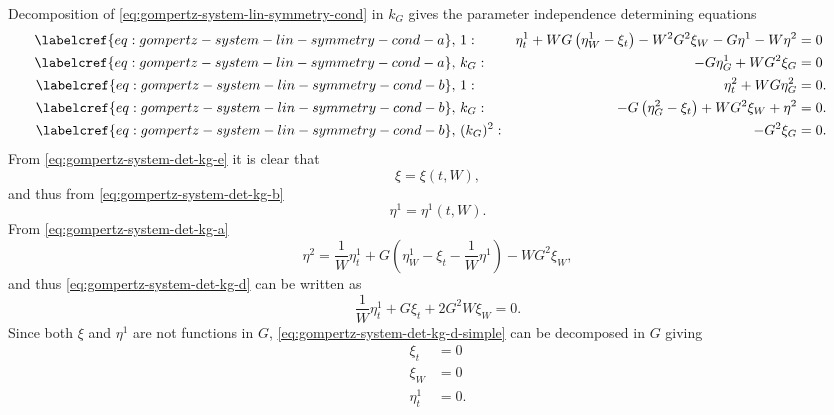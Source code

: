 Decomposition of \cref{eq:gompertz-system-lin-symmetry-cond} in \(k_G\) gives the parameter independence determining equations
\begin{subequations}
  \begin{flalign}
    \labelcref{eq:gompertz-system-lin-symmetry-cond-a},\ & 1 : & \eta^1_t + W G \left(\eta^1_W - \xi_t\right) - W^2 G^2 \xi_W - G \eta^1 - W \eta^2 &= 0 &\label{eq:gompertz-system-det-kg-a}\\
    \labelcref{eq:gompertz-system-lin-symmetry-cond-a},\ & k_G : & - G \eta^1_G + W G^2 \xi_G &= 0 &\label{eq:gompertz-system-det-kg-b}\\
    \labelcref{eq:gompertz-system-lin-symmetry-cond-b},\ & 1 : & \eta^2_t + W G \eta^2_G &= 0. &\label{eq:gompertz-system-det-kg-c} \\
    \labelcref{eq:gompertz-system-lin-symmetry-cond-b},\ & k_G : & - G \left(\eta^2_G - \xi_t\right) + W G^2 \xi_W + \eta^2 &= 0. &\label{eq:gompertz-system-det-kg-d} \\
    \labelcref{eq:gompertz-system-lin-symmetry-cond-b},\ & (k_G)^2 : & - G^2 \xi_G &= 0. &\label{eq:gompertz-system-det-kg-e}
  \end{flalign}
\end{subequations}
From \cref{eq:gompertz-system-det-kg-e} it is clear that
\begin{equation} \label{eq:system-gompertz-kG-first-simplification-1}
  \xi = \xi(t, W),
\end{equation}
and thus from \cref{eq:gompertz-system-det-kg-b}
\begin{equation} \label{eq:system-gompertz-kG-first-simplification-2}
  \eta^1 = \eta^1(t, W).
\end{equation}
From \cref{eq:gompertz-system-det-kg-a}
\begin{equation*}
  \eta^2 = \frac{1}{W}\eta^1_t + G \left(\eta^1_W - \xi_t - \frac{1}{W} \eta^1 \right) - W G^2 \xi_W,
\end{equation*}
and thus \cref{eq:gompertz-system-det-kg-d} can be written as
\begin{equation}\label{eq:gompertz-system-det-kg-d-simple}
  \frac{1}{W}\eta^1_t + G \xi_t + 2 G^2 W \xi_W = 0.
\end{equation}
Since both \(\xi\) and \(\eta^1\) are not functions in \(G\), \cref{eq:gompertz-system-det-kg-d-simple} can be decomposed in \(G\) giving
\begin{align*}
  \xi_t &= 0\\
  \xi_W &= 0\\
  \eta^1_t &= 0.
\end{align*}
